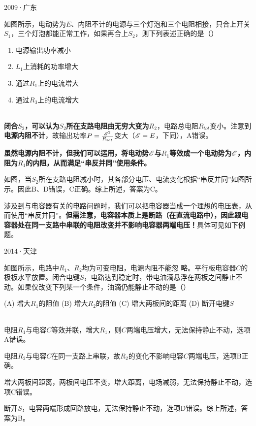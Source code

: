 \begin{ep}{2009·广东}{}



如图所示，电动势为$E$、内阻不计的电源与三个灯泡和三个电阻相接，只合上开关$S_1$，三个灯泡都能正常工作，如果再合上$S_2$，则下列表述正确的是（）

\begin{enumerate}[label=(\Alph*)]
  \item 电源输出功率减小
  \item $L_1$上消耗的功率增大
  \item 通过$R_1$上的电流增大
  \item 通过$R_3$上的电流增大
\end{enumerate}

~\\
\textbf{闭合$S_2$，可以认为$S_2$所在支路电阻由无穷大变为$R_2$}，电路总电阻$R_{tot}$变小。注意到\textbf{电源内阻不计}，故输出功率$P=\frac{\mathscr{E}^2}{R_{tot}}$变大（$\mathscr{E} = E$，下同），A错误。

\textbf{虽然电源内阻不计，但我们可以运用，将电动势$\mathscr{E}$与$R_1$等效成一个电动势为$\mathscr{E}$，内阻为$R_1$的内阻，从而满足“串反并同”使用条件。}



如图，当$S_2$所在支路电阻减小时，其各部分电压、电流变化根据“串反并同”如图所示。因此B、D错误，C正确。综上所述，答案为C。

\end{ep}

涉及到与电容器有关的电路问题时，我们可以把电容器当成一个理想的电压表，从而使用“串反并同”。\textbf{但需注意，电容器本质上是断路（在直流电路中），因此跟电容器处在同一支路中串联的电阻改变并不影响电容器两端电压！}具体可见如下例题。

\begin{ep}{2014·天津}{}



如图所示，电路中$R_1$、$R_2$均为可变电阻，电源内阻不能忽
略。平行板电容器$C$的极板水平放置。闭合电键$S$，电路达到稳定时，带电油滴悬浮在两板之间静止不动。如果仅改变下列某一个条件，油滴仍能静止不动的是（）

(A) 增大$R_1$的阻值 \quad (B) 增大$R_2$的阻值 \quad (C) 增大两板间的距离 \quad (D) 断开电键$S$

~\\
电阻$R_1$与电容$C$等效并联，增大$R_1$，则$C$两端电压增大，无法保持静止不动，选项A错误。

电阻$R_2$与电容$C$在同一支路上串联，故$R_2$的变化不影响电容$C$两端电压，选项B正确。

增大两板间距离，两板间电压不变，增大距离，电场减弱，无法保持静止不动，选项C错误。

断开$S$，电容两端形成回路放电，无法保持静止不动，选项D错误。综上所述，答案为B。
\end{ep}

